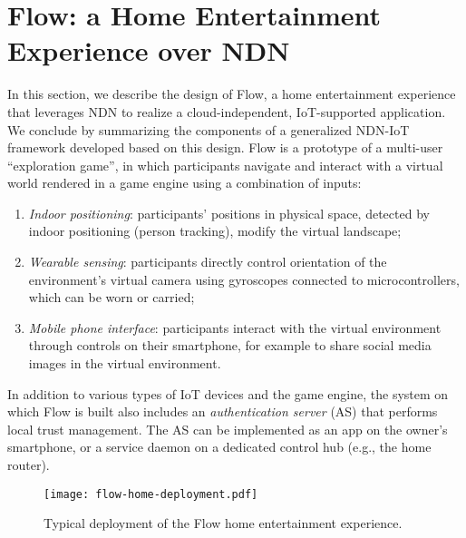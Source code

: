 \section{Flow: a Home Entertainment Experience over NDN}
\label{sec:components}

In this section, we describe the design of Flow, a home entertainment experience that leverages NDN to realize a cloud-independent, IoT-supported application. We conclude by summarizing the components of a generalized NDN-IoT framework developed based on this design.
Flow is a prototype of a multi-user ``exploration game'', in which participants navigate and interact with a virtual world rendered in a game engine using a combination of inputs: 
\begin{enumerate}
\item \textit{Indoor positioning}: participants' positions in physical space, detected by indoor positioning (person tracking), modify the virtual landscape;
\item \textit{Wearable sensing}: participants directly control orientation of the environment's virtual camera using gyroscopes connected to  microcontrollers, which can be worn or carried; 
\item \textit{Mobile phone interface}: participants interact with the virtual environment through controls on their smartphone, for example to share social media images in the virtual environment.
\end{enumerate}
In addition to various types of IoT devices and the game engine, the system on which Flow is built also includes an \textit{authentication server} (AS) that performs local trust management.
The AS can be implemented as an app on the owner's smartphone, or a service daemon on a dedicated control hub (e.g., the home router).

\begin{figure}[!t]
\centering
\texttt{[image: flow-home-deployment.pdf]}
\caption{Typical deployment of the Flow home entertainment experience.}
\label{fig:flow-deployment}
\end{figure}



